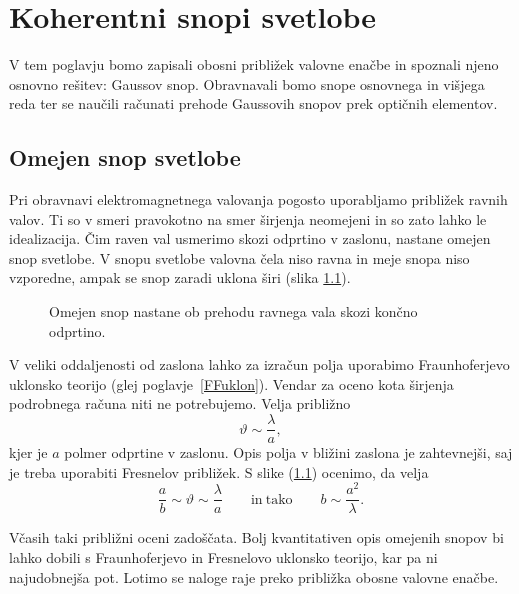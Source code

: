 
\chapter{Koherentni snopi svetlobe}
V tem poglavju bomo zapisali obosni približek valovne enačbe in spoznali 
njeno osnovno rešitev: Gaussov snop. Obravnavali bomo snope osnovnega in višjega reda ter
se naučili računati prehode Gaussovih snopov prek optičnih elementov. 

\section{Omejen snop svetlobe}
Pri obravnavi elektromagnetnega valovanja pogosto uporabljamo
približek ravnih valov. Ti so v smeri pravokotno na smer širjenja
neomejeni in so zato lahko le idealizacija. Čim raven val usmerimo skozi odprtino
v zaslonu, nastane omejen snop svetlobe. V snopu svetlobe valovna čela niso
ravna in meje snopa niso vzporedne, ampak se snop zaradi uklona širi 
(slika \ref{fig:Uklon-na-rezi}).
\begin{figure}[h]
\centering
\def\svgwidth{120truemm} 

\caption{Omejen snop nastane ob prehodu ravnega vala skozi končno odprtino.}
\label{fig:Uklon-na-rezi}
\end{figure}

V veliki oddaljenosti od zaslona lahko za izračun polja uporabimo
Fraunhoferjevo uklonsko teorijo (glej poglavje~\ref{FFuklon}). 
Vendar za oceno kota širjenja podrobnega računa niti ne potrebujemo. Velja približno 
\begin{equation}
\vartheta\sim\frac{\lambda}{a},
\label{eq:kot_ocena}
\end{equation}
kjer je $a$ polmer odprtine v zaslonu.
Opis polja v bližini zaslona je zahtevnejši, saj je treba uporabiti 
Fresnelov približek. S slike (\ref{fig:Uklon-na-rezi})
ocenimo, da velja
\begin{equation}
\frac{a}{b}\sim{\vartheta}\sim \frac{\lambda}{a} \qquad \mathrm{in~tako} \qquad b\sim\frac{a^2}{\lambda}.
\label{eq:z_ocena}
\end{equation}

Včasih taki približni oceni zadoščata. Bolj kvantitativen opis omejenih
snopov bi lahko dobili s Fraunhoferjevo in Fresnelovo uklonsko teorijo,
kar pa ni najudobnejša pot. Lotimo se naloge raje preko približka
obosne valovne enačbe.


